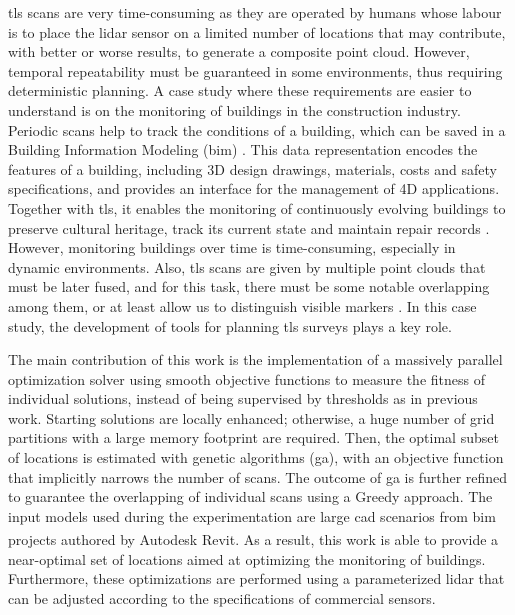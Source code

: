 \begin{kaobox}[frametitle=Case study of \acrshort{tls} optimization: Building Information Modelling]
\acrshort{tls} scans are very time-consuming as they are operated by humans whose labour is to place the \acrshort{lidar} sensor on a limited number of locations that may contribute, with better or worse results, to generate a composite point cloud. However, temporal repeatability must be guaranteed in some environments, thus requiring deterministic planning. A case study where these requirements are easier to understand is on the monitoring of buildings in the construction industry. Periodic scans help to track the conditions of a building, which can be saved in a Building Information Modeling (\acrshort{bim}) \cite{macher_point_2017}. This data representation encodes the features of a building, including 3D design drawings, materials, costs and safety specifications, and provides an interface for the management of 4D applications. Together with \acrshort{tls}, it enables the monitoring of continuously evolving buildings to preserve cultural heritage, track its current state and maintain repair records \cite{rocha_scan--bim_2020, andriasyan_point_2020, moyano_bringing_2020, ham_phased_2020}. However, monitoring buildings over time is time-consuming, especially in dynamic environments. Also, \acrshort{tls} scans are given by multiple point clouds that must be later fused, and for this task, there must be some notable overlapping among them, or at least allow us to distinguish visible markers \cite{gollob_comparison_2020}. In this case study, the development of tools for planning \acrshort{tls} surveys plays a key role. 
\end{kaobox}

The main contribution of this work is the implementation of a massively parallel optimization solver using smooth objective functions to measure the fitness of individual solutions, instead of being supervised by thresholds as in previous work. Starting solutions are locally enhanced; otherwise, a huge number of grid partitions with a large memory footprint are required. Then, the optimal subset of locations is estimated with genetic algorithms (\acrshort{ga}), with an objective function that implicitly narrows the number of scans. The outcome of \acrshort{ga} is further refined to guarantee the overlapping of individual scans using a Greedy approach. The input models used during the experimentation are large \acrshort{cad} scenarios from \acrshort{bim} projects authored by Autodesk Revit\textsuperscript{\textregistered}. As a result, this work is able to provide a near-optimal set of locations aimed at optimizing the monitoring of buildings. Furthermore, these optimizations are performed using a parameterized \acrshort{lidar} that can be adjusted according to the specifications of commercial sensors. 

